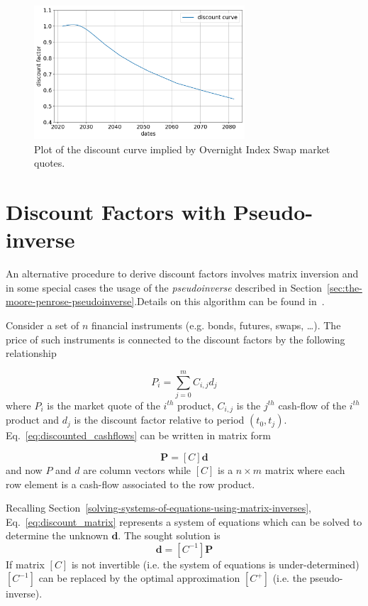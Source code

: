 \begin{figure}[htb]
	\centering
	\includegraphics[width=0.7\textwidth]{figures/example_discount_curve}
	\caption{Plot of the discount curve implied by Overnight Index Swap market quotes.}
	\label{fig:discount_curve}
\end{figure}

\section{Discount Factors with Pseudo-inverse}
An alternative procedure to derive discount factors involves matrix inversion and in some special cases the usage of the \emph{pseudoinverse} described in Section~\ref{sec:the-moore-penrose-pseudoinverse}.Details on this algorithm can be found in~\cite{bib:boostrap_pseudoinv}.

Consider a set of $n$ financial instruments (e.g. bonds, futures, swaps, \ldots). The price of such instruments is connected to the discount factors by the following relationship

\begin{equation}
P_i = \sum_{j=0}^{m} C_{i,j} d_j
\label{eq:discounted_cashflows}
\end{equation}
where $P_i$ is the market quote of the $i^{th}$ product, $C_{i,j}$ is the $j^{th}$ cash-flow of the $i^{th}$ product and $d_j$ is the discount factor relative to period $(t_0, t_j)$.
Eq.~\ref{eq:discounted_cashflows} can be written in matrix form

\begin{equation}
\boldsymbol{P} = [C]\boldsymbol{d}
\label{eq:discount_matrix}
\end{equation}
and now $P$ and $d$ are column vectors while $[C]$ is a $n \times m$ matrix where each row element is a cash-flow associated to the row product.

Recalling Section~\ref{solving-systems-of-equations-using-matrix-inverses}, Eq.~\ref{eq:discount_matrix} represents a system of equations which can be solved to determine the unknown $\boldsymbol{d}$.
The sought solution is 
\begin{equation}
\boldsymbol{d} = [C^{-1}] \boldsymbol{P}
\end{equation} 
If matrix $[C]$ is not invertible (i.e. the system of equations is under-determined) $[C^{-1}]$ can be replaced by the optimal approximation $[C^+]$ (i.e. the pseudo-inverse). 

